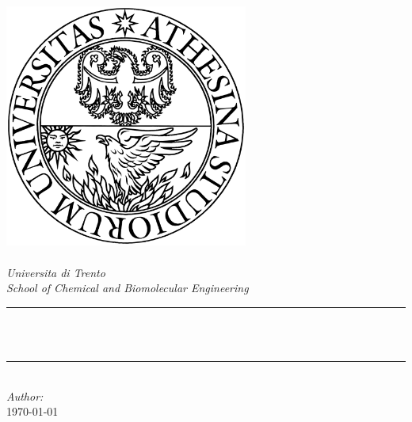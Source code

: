 \begin{titlepage}
\newcommand{\HRule}{\rule{\linewidth}{0.5mm}} 
\center 
\includegraphics[width=8cm]{title/logo.png}\\[1cm]
\quad\\[1.5cm]
\textsl{\Large Universita di Trento}\\[0.5cm] 
\textsl{\large School of Chemical and Biomolecular Engineering}\\[0.5cm] 
\makeatletter
\HRule \\[0.4cm]
{ \huge \bfseries \@title}\\[0.4cm] 
\HRule \\[1.5cm]
\emph{Author:}\\
\@author 
\makeatother
{\large \today}\\[2cm] 
\vfill 
\end{titlepage}
